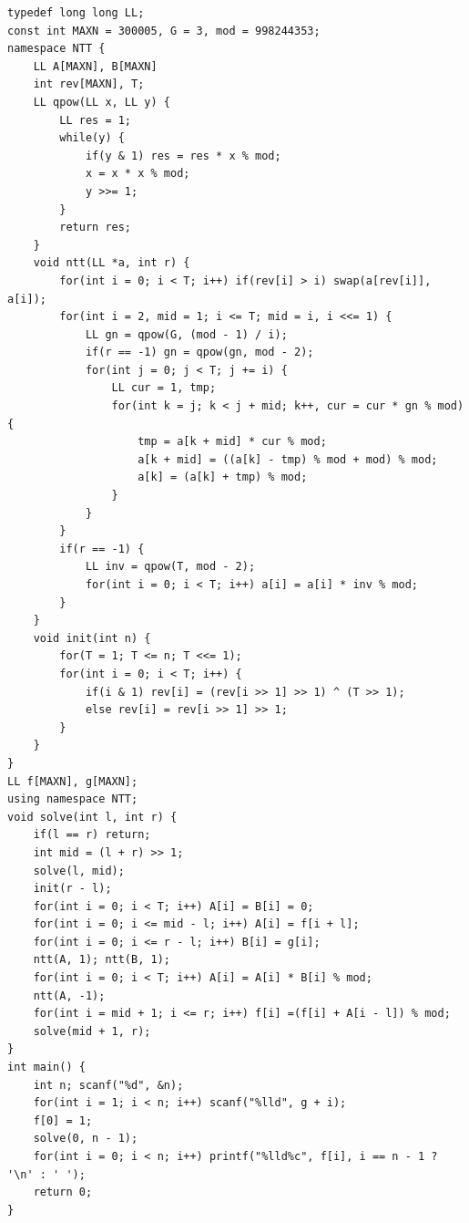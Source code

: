\documentclass[10pt]{ctexart}
\begin{document}
{\begin{lstlisting}
typedef long long LL;
const int MAXN = 300005, G = 3, mod = 998244353;
namespace NTT {
    LL A[MAXN], B[MAXN]
    int rev[MAXN], T;
    LL qpow(LL x, LL y) {
        LL res = 1;
        while(y) {
            if(y & 1) res = res * x % mod;
            x = x * x % mod;
            y >>= 1;
        }
        return res;
    }
    void ntt(LL *a, int r) {
        for(int i = 0; i < T; i++) if(rev[i] > i) swap(a[rev[i]], a[i]);
        for(int i = 2, mid = 1; i <= T; mid = i, i <<= 1) {
            LL gn = qpow(G, (mod - 1) / i);
            if(r == -1) gn = qpow(gn, mod - 2);
            for(int j = 0; j < T; j += i) {
                LL cur = 1, tmp;
                for(int k = j; k < j + mid; k++, cur = cur * gn % mod) {
                    tmp = a[k + mid] * cur % mod;
                    a[k + mid] = ((a[k] - tmp) % mod + mod) % mod;
                    a[k] = (a[k] + tmp) % mod;
                }
            }
        }
        if(r == -1) {
            LL inv = qpow(T, mod - 2);
            for(int i = 0; i < T; i++) a[i] = a[i] * inv % mod;
        }
    }
    void init(int n) {
        for(T = 1; T <= n; T <<= 1);
        for(int i = 0; i < T; i++) {
            if(i & 1) rev[i] = (rev[i >> 1] >> 1) ^ (T >> 1);
            else rev[i] = rev[i >> 1] >> 1;
        }
    }
}
LL f[MAXN], g[MAXN];
using namespace NTT;
void solve(int l, int r) {
    if(l == r) return;
    int mid = (l + r) >> 1;
    solve(l, mid);
    init(r - l);
    for(int i = 0; i < T; i++) A[i] = B[i] = 0;
    for(int i = 0; i <= mid - l; i++) A[i] = f[i + l];
    for(int i = 0; i <= r - l; i++) B[i] = g[i];
    ntt(A, 1); ntt(B, 1);
    for(int i = 0; i < T; i++) A[i] = A[i] * B[i] % mod;
    ntt(A, -1);
    for(int i = mid + 1; i <= r; i++) f[i] =(f[i] + A[i - l]) % mod;
    solve(mid + 1, r);
}
int main() {
    int n; scanf("%d", &n);
    for(int i = 1; i < n; i++) scanf("%lld", g + i); 
    f[0] = 1;
    solve(0, n - 1);
    for(int i = 0; i < n; i++) printf("%lld%c", f[i], i == n - 1 ? '\n' : ' ');
    return 0;
}
\end{lstlisting}
}
\end{document}
